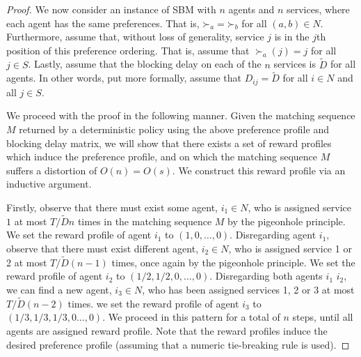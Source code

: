 \documentclass[letterpaper,11pt]{article}
\begin{document}
\begin{proof}
    
    We now consider an instance of SBM with $n$ agents and $n$ services, where each agent has the same preferences. That is, $\mathord{\succ}_{a} = \mathord{\succ}_{b}$ for all $(a, b) \in N$. Furthermore, assume that, without loss of generality, service $j$ is in the $j$th position of this preference ordering. That is, assume that $\mathord{\succ_{a}}(j) = j$ for all $j \in S$. Lastly, assume that the blocking delay on each of the $n$ services is $\tilde{D}$ for all agents. In other words, put more formally, assume that $D_{ij} = \tilde{D}$ for all $i \in N$ and all $j \in S$.  
    
    We proceed with the proof in the following manner. Given the matching sequence $M$ returned by a deterministic policy using the above preference profile and blocking delay matrix, we will show that there exists a set of reward profiles which induce the preference profile, and on which the matching sequence $M$ suffers a distortion of $O(n) = O(s)$. We construct this reward profile via an inductive argument.
    
    
    Firstly, observe that there must exist some agent, $i_{1} \in N$, who is assigned service $1$ at most $T/\tilde{D}n$ times in the matching sequence $M$ by the pigeonhole principle. We set the reward profile of agent $i_{1}$ to $(1, 0, \dots, 0)$. Disregarding agent $i_{1}$, observe that there must exist different agent, $i_{2} \in N$, who is assigned service 1 or 2 at most $T/\tilde{D}(n-1)$ times, once again by the pigeonhole principle. We set the reward profile of agent $i_{2}$ to  $(1/2, 1/2, 0, \dots, 0)$. Disregarding both agents $i_{1}$ $i_{2}$, we can find a new agent, $i_{3} \in N$, who has been assigned services 1, 2 or 3 at most $T/\tilde{D}(n-2)$ times. we set the reward profile of agent $i_{3}$ to $ (1/3, 1/3, 1/3, 0 \dots, 0)$. We proceed in this pattern for a total of $n$ steps, until all agents are assigned reward profile. Note that the reward profiles induce the desired preference profile (assuming that a numeric tie-breaking rule is used).
    

\end{proof}
\end{document}
